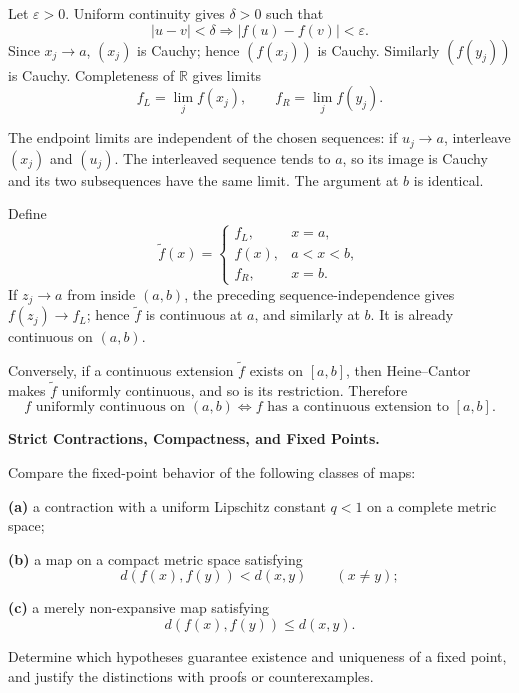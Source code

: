 \begin{solution}
Let \(\varepsilon>0\). Uniform continuity gives \(\delta>0\) such that
\[
|u-v|<\delta\Longrightarrow |f(u)-f(v)|<\varepsilon.
\]
Since \(x_j\to a\), \((x_j)\) is Cauchy; hence \((f(x_j))\) is Cauchy. Similarly
\((f(y_j))\) is Cauchy. Completeness of \(\mathbb R\) gives limits
\[
f_L=\lim_jf(x_j),\qquad f_R=\lim_jf(y_j).
\]

The endpoint limits are independent of the chosen sequences: if \(u_j\to a\), interleave
\((x_j)\) and \((u_j)\). The interleaved sequence tends to \(a\), so its image is
Cauchy and its two subsequences have the same limit. The argument at \(b\) is identical.

Define
\[
\widetilde f(x)=
\begin{cases}
f_L,&x=a,\\
f(x),&a<x<b,\\
f_R,&x=b.
\end{cases}
\]
If \(z_j\to a\) from inside \((a,b)\), the preceding sequence-independence gives
\(f(z_j)\to f_L\); hence \(\widetilde f\) is continuous at \(a\), and similarly at
\(b\). It is already continuous on \((a,b)\).

Conversely, if a continuous extension \(\widetilde f\) exists on \([a,b]\), then
Heine--Cantor makes \(\widetilde f\) uniformly continuous, and so is its restriction.
Therefore
\[
\boxed{
f\text{ uniformly continuous on }(a,b)
\iff
f\text{ has a continuous extension to }[a,b].
}
\]
\end{solution}

\begin{problem}[CP-II-0265]
\label{prob:cp-ii-0265}
\textbf{Strict Contractions, Compactness, and Fixed Points.}

\hspace*{1.5em}Compare the fixed-point behavior of the following classes of maps:

\par\smallskip\noindent\textbf{(a)}\quad
a contraction with a uniform Lipschitz constant \(q<1\) on a complete metric
space;

\par\smallskip\noindent\textbf{(b)}\quad
a map on a compact metric space satisfying
\[
d(f(x),f(y))<d(x,y)
\qquad(x\ne y);
\]

\par\smallskip\noindent\textbf{(c)}\quad
a merely non-expansive map satisfying
\[
d(f(x),f(y))\le d(x,y).
\]

Determine which hypotheses guarantee existence and uniqueness of a fixed point,
and justify the distinctions with proofs or counterexamples.
\end{problem}

